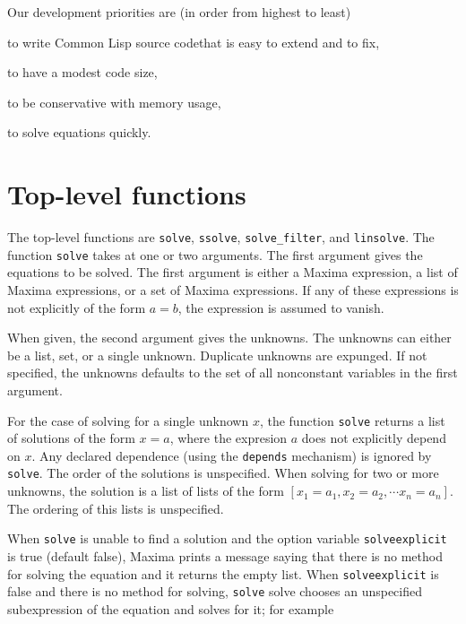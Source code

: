 \documentclass[]{scrartcl}
\begin{document}
Our development priorities are (in order from highest to least)

\begin{alphalist}[]

\item to write  Common Lisp source codethat is easy to extend and to fix,

\item to have a modest code size,

\item to be conservative with memory usage,

\item to solve equations quickly.

\end{alphalist}

\section{Top-level functions}

The top-level functions are \texttt{solve}, \texttt{ssolve}, \texttt{solve\_filter},
and \texttt{linsolve}. The function \texttt{solve} takes at one or two arguments. The first
argument gives the equations to be solved. The first argument is either a Maxima expression,
a list of Maxima expressions, or a set of Maxima expressions. If any of these expressions is
not explicitly of the form \(a = b\), the expression is assumed to vanish.

When given, the second argument gives the unknowns. The unknowns can either be a list, set, or
a single unknown. Duplicate unknowns are expunged. If not specified, the unknowns defaults to
the set of all nonconstant variables in the first argument.

For the case of solving for a single unknown \(x\), the function \texttt{solve} returns a list
of solutions of the form \(x = a\), where the expresion \(a\) does not explicitly depend on \(x\).
Any declared dependence (using the \texttt{depends} mechanism) is ignored by \texttt{solve}.
The order of the solutions is unspecified. When solving for two or more unknowns, the solution
is a list of lists of the form \([x_1 = a_1, x_2 = a_2, \cdots x_n = a_n] \). The ordering of
this lists is unspecified.

When \texttt{solve} is unable to find a solution and the option variable \texttt{solveexplicit}
is true (default false), Maxima prints a message saying that there is no method for solving the
equation and it returns the empty list. When \texttt{solveexplicit} is false and there is no
method for solving, \texttt{solve} solve chooses an unspecified subexpression of the equation
and solves for it; for example
\end{document}
